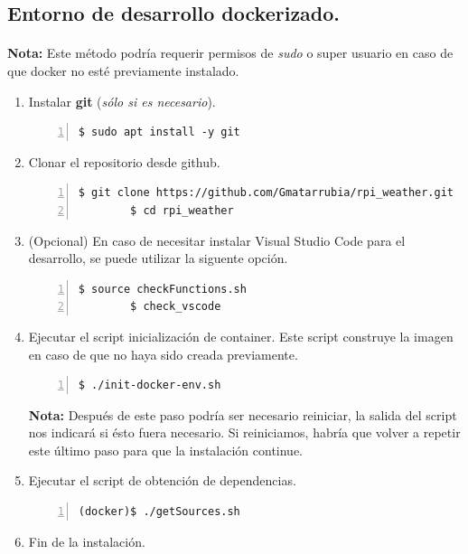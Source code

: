 \subsection{Entorno de desarrollo dockerizado.}

\paragraph{}\textbf{Nota:} Este método podría requerir permisos de \emph{sudo} o super
usuario en caso de que docker no esté previamente instalado.

\begin{enumerate}
    \item Instalar \textbf{\gls{git}} (\emph{sólo si es necesario}).
    \begin{lstlisting}[style=consola, numbers=left]
        $ sudo apt install -y git
    \end{lstlisting}

    \item Clonar el repositorio desde github.
    \begin{lstlisting}[style=consola, numbers=left]
        $ git clone https://github.com/Gmatarrubia/rpi_weather.git
        $ cd rpi_weather
    \end{lstlisting}

    \item (Opcional) En caso de necesitar instalar Visual Studio Code para el desarrollo,
    se puede utilizar la siguente opción.
    \begin{lstlisting}[style=consola, numbers=left]
        $ source checkFunctions.sh
        $ check_vscode
    \end{lstlisting}

    \item Ejecutar el script inicialización de container. Este script construye la
    imagen en caso de que no haya sido creada previamente.
    \begin{lstlisting}[style=consola, numbers=left]
        $ ./init-docker-env.sh
    \end{lstlisting}
    \textbf{Nota:} Después de este paso podría ser necesario reiniciar, la salida del
    script nos indicará si ésto fuera necesario. Si reiniciamos, habría que volver
    a repetir este último paso para que la instalación continue.

    \item Ejecutar el script de obtención de dependencias.
    \begin{lstlisting}[style=consola, numbers=left]
        (docker)$ ./getSources.sh
    \end{lstlisting}

    \item Fin de la instalación.
\end{enumerate}

